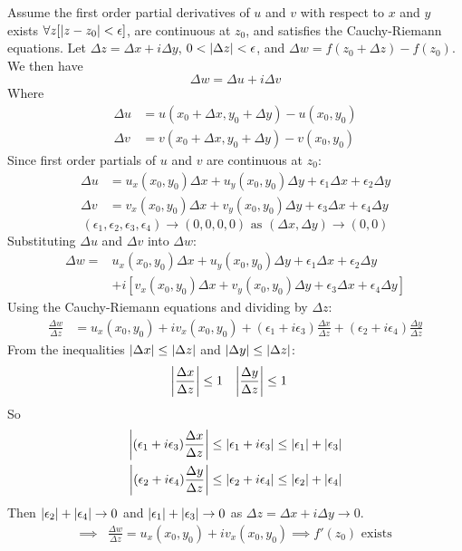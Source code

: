 \documentclass[12pt, english]{book}
\makeatletter
\renewenvironment{proof}[1][\proofname]{\par
	\pushQED{\qed}%
	\normalfont \topsep6\p@\@plus6\p@\relax
	\list{}{%
		\settowidth{\leftmargin}{\itshape\proofname:\hskip\labelsep}%
		\setlength{\labelwidth}{0pt}%
		\setlength{\itemindent}{-\leftmargin}%
	}%
	\item[\hskip\labelsep\itshape#1\@addpunct{:}]\ignorespaces
	}{ \popQED\endlist\@endpefalse}
\makeatother
\begin{document}
	\begin{proof}
		Assume the first order partial derivatives of \(u\) and \(v\) with respect to \(x\) and \(y\) exists \(\forall z [\abs{z-z_0}<\epsilon]\), are continuous at \(z_0\), and satisfies the Cauchy-Riemann equations. 
		Let \(\Delta z = \Delta x + i\Delta y\), \(0<\abs{\Delta z}<\epsilon\), and \(\Delta w = f(z_0 + \Delta z) - f(z_0)\).
		We then have \[\Delta w = \Delta u + i\Delta v\]
		Where
		\begin{align*}
			\Delta u &= u(x_0 + \Delta x, y_0 + \Delta y) - u(x_0, y_0) \\
			\Delta v &= v(x_0 + \Delta x, y_0 + \Delta y) - v(x_0, y_0) 
		\end{align*}
		Since first order partials of \(u\) and \(v\) are continuous at \(z_0\):
		\begin{align*}
			\Delta u &= u_x(x_0, y_0)\Delta x + u_y(x_0, y_0)\Delta y + \epsilon_1\Delta x + \epsilon_2 \Delta y \\
			\Delta v &= v_x(x_0, y_0)\Delta x + v_y(x_0, y_0)\Delta y + \epsilon_3\Delta x + \epsilon_4 \Delta y
		\end{align*}
		\[(\epsilon_1, \epsilon_2, \epsilon_3, \epsilon_4) \rightarrow (0,0,0,0) \text{ as } (\Delta x, \Delta y) \rightarrow (0,0)\]
		Substituting \(\Delta u\) and \(\Delta v\) into \(\Delta w\):
		\begin{align*}
			\Delta w 
				=& u_x(x_0, y_0)\Delta x + u_y(x_0, y_0)\Delta y + \epsilon_1\Delta x + \epsilon_2 \Delta y \\
				&+ i[v_x(x_0, y_0)\Delta x + v_y(x_0, y_0)\Delta y + \epsilon_3\Delta x + \epsilon_4 \Delta y]
		\end{align*}
		Using the Cauchy-Riemann equations and dividing by \(\Delta z\):
		\begin{align*}
			\frac{\Delta w}{\Delta z}
			&= u_x(x_0, y_0) + iv_x(x_0, y_0) + (\epsilon_1 + i\epsilon_3) \frac{\Delta x}{\Delta z} + (\epsilon_2 + i\epsilon_4) \frac{\Delta y}{\Delta z}
		\end{align*}
		From the inequalities \(\abs{\Delta x} \leq \abs{\Delta z}\) and \(\abs{\Delta y} \leq \abs{\Delta z}\):
		\begin{align*}
			\abs{\frac{\Delta x}{\Delta z}} &\leq 1		&
			\abs{\frac{\Delta y}{\Delta z}} &\leq 1	
		\end{align*}
		So
		\begin{align*}
			\abs{(\epsilon_1 + i\epsilon_3 )\frac{\Delta x}{\Delta z}} 
				&\leq \abs{\epsilon_1 + i \epsilon_3} \leq \abs{\epsilon_1} + \abs{\epsilon_3} \\
			\abs{(\epsilon_2 + i\epsilon_4 )\frac{\Delta y}{\Delta z}} 
				&\leq \abs{\epsilon_2 + i \epsilon_4} \leq \abs{\epsilon_2} + \abs{\epsilon_4}
		\end{align*}
		Then \(\abs{\epsilon_2} + \abs{\epsilon_4} \rightarrow 0\) and \(\abs{\epsilon_1} + \abs{\epsilon_3} \rightarrow 0\) as \(\Delta z = \Delta x + i\Delta y \rightarrow 0\).
		\begin{align*}
			\implies& \frac{\Delta w}{\Delta z} = u_x(x_0, y_0) + iv_x(x_0, y_0) 
			\implies f'(z_0) \text{ exists}
		\end{align*}
	\end{proof}
\end{document}
